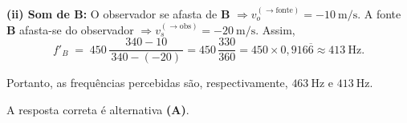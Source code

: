 \begin{flushleft}
\textbf{(ii) Som de \(\mathbf{B}\):} O observador se afasta de \(\mathbf{B}\) \(\Rightarrow v_o^{(\to \text{fonte})}=-10\ \text{m/s}\). A fonte \(\mathbf{B}\) afasta-se do observador \(\Rightarrow v_s^{(\to \text{obs})}=-20\ \text{m/s}\).
Assim,
\[
f'_B \;=\; 450\,\frac{340-10}{\,340-(-20)\,}
= 450\,\frac{330}{360}
= 450\times 0{,}916\overline{6}
\approx 413\ \text{Hz}.
\]

Portanto, as frequ\^encias percebidas s\~ao, respectivamente, \(\boxed{463\ \text{Hz} \text{ e } 413\ \text{Hz}}\).

\vspace{0.3cm}

A resposta correta \'e alternativa \colorbox{green!50}{\textbf{(A)}}.

\end{flushleft}


%
%
%
%
%
%
%
%
